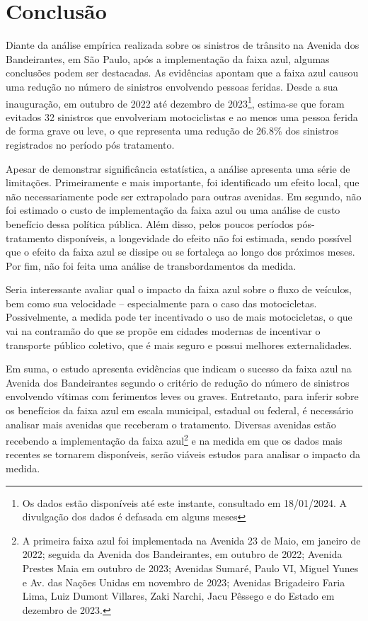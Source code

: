 \section{Conclusão}

Diante da análise empírica realizada sobre os sinistros de trânsito na Avenida dos Bandeirantes, em São Paulo, após a implementação da faixa azul, algumas conclusões podem ser destacadas. As evidências apontam que a faixa azul causou uma redução no número de sinistros envolvendo pessoas feridas. Desde a sua inauguração, em outubro de 2022 até dezembro de 2023\footnote{Os dados estão disponíveis até este instante, consultado em 18/01/2024. A divulgação dos dados é defasada em alguns meses}, estima-se que foram evitados 32 sinistros que envolveriam motociclistas e ao menos uma pessoa ferida de forma grave ou leve, o que representa uma redução de 26.8\% dos sinistros registrados no período pós tratamento.

Apesar de demonstrar significância estatística, a análise apresenta uma série de limitações. Primeiramente e mais importante, foi identificado um efeito local, que não necessariamente pode ser extrapolado para outras avenidas. Em segundo, não foi estimado o custo de implementação da faixa azul ou uma análise de custo benefício dessa política pública. Além disso, pelos poucos períodos pós-tratamento disponíveis, a longevidade do efeito não foi estimada, sendo possível que o efeito da faixa azul se dissipe ou se fortaleça ao longo dos próximos meses. Por fim, não foi feita uma análise de transbordamentos da medida. 

Seria interessante avaliar qual o impacto da faixa azul sobre o fluxo de veículos, bem como sua velocidade -- especialmente para o caso das motocicletas. Possivelmente, a medida pode ter incentivado o uso de mais motocicletas, o que vai na contramão do que se propõe em cidades modernas de incentivar o transporte público coletivo, que é mais seguro e possui melhores externalidades.

Em suma, o estudo apresenta evidências que indicam o sucesso da faixa azul na Avenida dos Bandeirantes segundo o critério de redução do número de sinistros envolvendo vítimas com ferimentos leves ou graves. Entretanto, para inferir sobre os benefícios da faixa azul em escala municipal, estadual ou federal, é necessário analisar mais avenidas que receberam o tratamento. Diversas avenidas estão recebendo a implementação da faixa azul\footnote{A primeira faixa azul foi implementada na Avenida 23 de Maio, em janeiro de 2022; seguida da Avenida dos Bandeirantes, em outubro de 2022; Avenida Prestes Maia em outubro de 2023; Avenidas Sumaré, Paulo VI, Miguel Yunes e Av. das Nações Unidas em novembro de 2023; Avenidas Brigadeiro Faria Lima, Luiz Dumont Villares, Zaki Narchi, Jacu Pêssego e do Estado em dezembro de 2023.} e na medida em que os dados mais recentes se tornarem disponíveis, serão viáveis estudos para analisar o impacto da medida.

